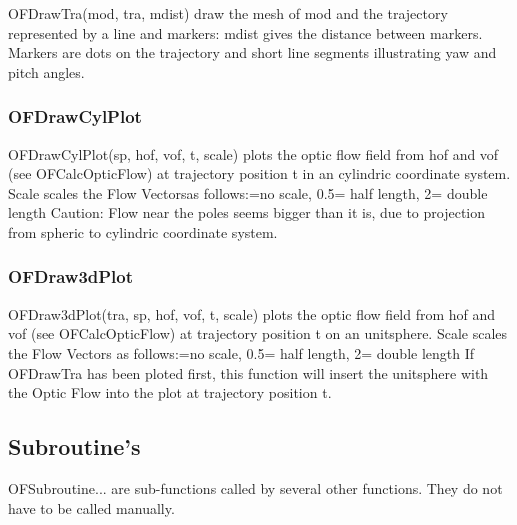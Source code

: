 \documentclass[a4paper]{article}
\begin{document}
OFDrawTra(mod, tra, mdist) draw the mesh of mod and the trajectory
represented by a line and markers: mdist gives the distance between
markers. Markers are dots on the trajectory and short line segments
illustrating yaw and pitch angles.

\subsubsection{OFDrawCylPlot}

OFDrawCylPlot(sp, hof, vof, t, scale) plots the optic flow field from hof and vof
(see OFCalcOpticFlow) at trajectory position t in an cylindric coordinate system.
Scale scales the Flow Vectorsas follows:=no scale, 0.5= half length, 2= double length\newline
Caution: Flow near the poles seems bigger than it is, due to projection from 
spheric to cylindric coordinate system.

\subsubsection{OFDraw3dPlot}

OFDraw3dPlot(tra, sp, hof, vof, t, scale) plots the optic flow field from hof and vof
(see OFCalcOpticFlow) at trajectory position t on an unitsphere.
Scale scales the Flow Vectors as follows:=no scale, 0.5= half length, 2= double length\newline
If OFDrawTra has been ploted first, this function will insert the unitsphere
with the Optic Flow into the plot at trajectory position t.

\subsection{Subroutine's}

OFSubroutine... are sub-functions called by several other functions.
They do not have to be called manually. 
\end{document}
